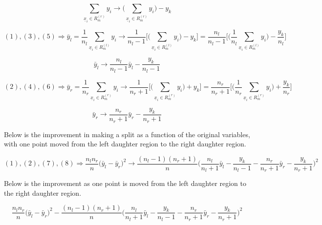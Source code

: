 \documentclass[11pt]{article}
\begin{document}
\begin{equation}
\sum_{ \underline{x}_i \in R_m^{(r)}} y_i \rightarrow \bigg( \sum_{ \underline{x}_i \in R_m^{(r)}}y_i \bigg) - y_k
\end{equation}

$$(1), (3), (5) \Rightarrow \bar{y}_l = \frac{1}{n_l}\sum_{\underline{x}_i \in R_m^{(l)}}y_i \rightarrow \frac{1}{n_l-1}\Bigg[\bigg(\sum_{\underline{x}_i \in R_m^{(l)}}y_i\bigg)-y_k\Bigg] = \frac{n_l}{n_l-1}\Bigg[\bigg(\frac{1}{n_l}\sum_{\underline{x}_i \in R_m^{(l)}}y_i\bigg) - \frac{y_k}{n_l}\Bigg]$$

\begin{equation}
\bar{y}_l \rightarrow \frac{n_l}{n_l-1}\bar{y}_l - \frac{y_k}{n_l-1}
\end{equation}

$$(2), (4), (6) \Rightarrow \bar{y}_r = \frac{1}{n_r}\sum_{\underline{x}_i \in R_m^{(r)}}y_i \rightarrow \frac{1}{n_r+1}\Bigg[\bigg(\sum_{\underline{x}_i \in R_m^{(r)}}y_i\bigg)+y_k\Bigg] = \frac{n_r}{n_r+1}\Bigg[\bigg(\frac{1}{n_r}\sum_{\underline{x}_i \in R_m^{(r)}}y_i\bigg) + \frac{y_k}{n_r}\Bigg]$$

\begin{equation}
\bar{y}_r \rightarrow \frac{n_r}{n_r+1}\bar{y}_r - \frac{y_k}{n_r+1}
\end{equation}

Below is the improvement in making a split as a function of the original variables, with one point moved from the left daughter region to the right daughter region. 

$$(1), (2), (7), (8) \Rightarrow \frac{n_ln_r}{n} \big(\bar{y}_l - \bar{y}_r\big)^2 \rightarrow \frac{(n_l-1)(n_r+1)}{n}\bigg(\frac{n_l}{n_l+1}\bar{y}_l - \frac{y_k}{n_l-1} - \frac{n_r}{n_r+1}\bar{y}_r - \frac{y_k}{n_r + 1}\bigg)^2$$

Below is the improvement as one point is moved from the left daughter region to the right daughter region. 

$$\frac{n_ln_r}{n} \big(\bar{y}_l - \bar{y}_r\big)^2 - \frac{(n_l-1)(n_r+1)}{n}\bigg(\frac{n_l}{n_l+1}\bar{y}_l - \frac{y_k}{n_l-1} - \frac{n_r}{n_r+1}\bar{y}_r - \frac{y_k}{n_r + 1}\bigg)^2$$
\end{document}

